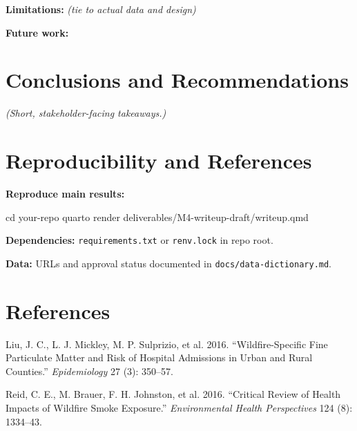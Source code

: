\documentclass[
  letterpaper,
  DIV=11,
  numbers=noendperiod]{scrartcl}
\newenvironment{Shaded}{\begin{snugshade}}{\end{snugshade}}
\newcommand{\BuiltInTok}[1]{\textcolor[rgb]{0.00,0.23,0.31}{#1}}
\newcommand{\ExtensionTok}[1]{\textcolor[rgb]{0.00,0.23,0.31}{#1}}
\newcommand{\NormalTok}[1]{\textcolor[rgb]{0.00,0.23,0.31}{#1}}
\newlength{\cslhangindent}
\newenvironment{CSLReferences}[2] %
 {\begin{list}{}{%
  \setlength{\itemindent}{0pt}
  \setlength{\leftmargin}{0pt}
  \setlength{\parsep}{0pt}
  \ifodd #1
   \setlength{\leftmargin}{\cslhangindent}
   \setlength{\itemindent}{-1\cslhangindent}
  \fi
  \setlength{\itemsep}{#2\baselineskip}}}
 {\end{list}}
\begin{document}
\textbf{Limitations:} \emph{(tie to actual data and design)}

\textbf{Future work:}

\section{Conclusions and
Recommendations}\label{conclusions-and-recommendations}

\emph{(Short, stakeholder-facing takeaways.)}

\section{Reproducibility and
References}\label{reproducibility-and-references}

\textbf{Reproduce main results:}

\begin{Shaded}
\begin{Highlighting}[]
\BuiltInTok{cd}\NormalTok{ your{-}repo}
\ExtensionTok{quarto}\NormalTok{ render deliverables/M4{-}writeup{-}draft/writeup.qmd}
\end{Highlighting}
\end{Shaded}

\textbf{Dependencies:} \texttt{requirements.txt} or \texttt{renv.lock}
in repo root.

\textbf{Data:} URLs and approval status documented in
\texttt{docs/data-dictionary.md}.

\section{References}\label{references}

\label{refs}
\begin{CSLReferences}{1}{0}
Liu, J. C., L. J. Mickley, M. P. Sulprizio, et al. 2016.
{``Wildfire-Specific Fine Particulate Matter and Risk of Hospital
Admissions in Urban and Rural Counties.''} \emph{Epidemiology} 27 (3):
350--57.

Reid, C. E., M. Brauer, F. H. Johnston, et al. 2016. {``Critical Review
of Health Impacts of Wildfire Smoke Exposure.''} \emph{Environmental
Health Perspectives} 124 (8): 1334--43.

\end{CSLReferences}
\end{document}
